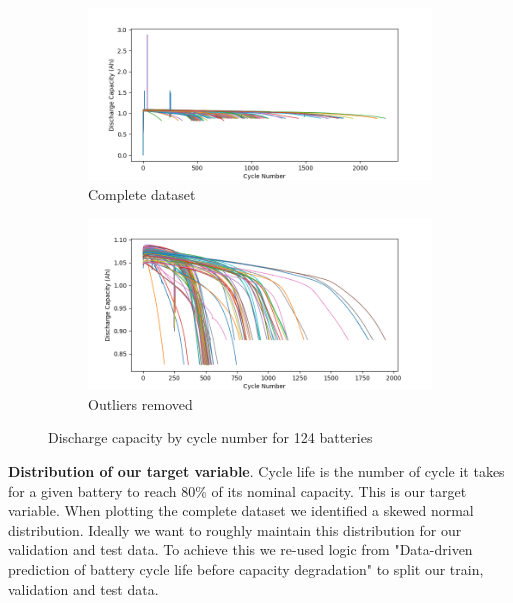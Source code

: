 \documentclass{article}
\begin{document}
    \begin{figure}[H]
        \centering
        \begin{subfigure}[b]{0.49\linewidth}
            \includegraphics[width=\linewidth]{figs/discharge_capacity_by_cycle.png}
            \caption{Complete dataset}
        \end{subfigure}
        \begin{subfigure}[b]{0.49\linewidth}
            \includegraphics[width=\linewidth]{figs/discharge_capacity_by_cycle_remove_outliers.png}
            \caption{Outliers removed}
        \end{subfigure}
        \caption{Discharge capacity by cycle number for 124 batteries}
        \label{fig:3a}
    \end{figure}

\textbf{Distribution of our target variable}. Cycle life is the number of cycle it takes for a given battery to reach 80\% of its nominal capacity. This is our target variable. When plotting the complete dataset we identified a skewed normal distribution. Ideally we want to roughly maintain this distribution for our validation and test data. To achieve this we re-used logic from "Data-driven prediction of battery cycle life before capacity degradation" \cite{severson2019data} to split our train, validation and test data.
\end{document}
